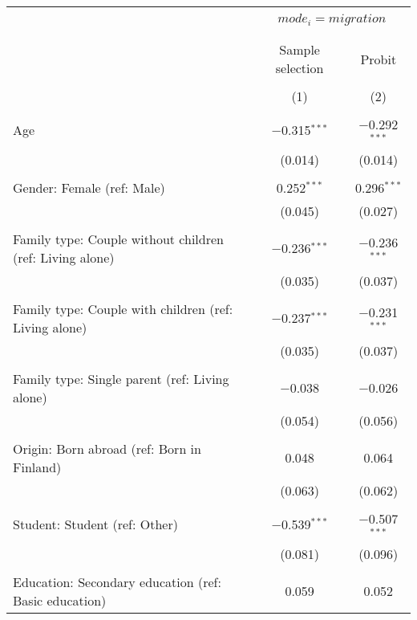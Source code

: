 
\begin{table}[!htbp] \centering 
  \caption{} 
  \label{} 
\begin{tabular}{@{\extracolsep{5pt}}lcc} 
\\[-1.8ex]\hline 
\hline \\[-1.8ex] 
 & \multicolumn{2}{c}{$mode_i = migration$} \\ 
\cline{2-3} 
\\[-1.8ex] &  &  \\ 
 & Sample selection & Probit \\ 
\\[-1.8ex] & (1) & (2)\\ 
\hline \\[-1.8ex] 
 Age & $-$0.315$^{***}$ & $-$0.292$^{***}$ \\ 
  & (0.014) & (0.014) \\ 
  & & \\ 
 Gender: Female (ref: Male) & 0.252$^{***}$ & 0.296$^{***}$ \\ 
  & (0.045) & (0.027) \\ 
  & & \\ 
 Family type: Couple without children (ref: Living alone) & $-$0.236$^{***}$ & $-$0.236$^{***}$ \\ 
  & (0.035) & (0.037) \\ 
  & & \\ 
 Family type: Couple with children (ref: Living alone) & $-$0.237$^{***}$ & $-$0.231$^{***}$ \\ 
  & (0.035) & (0.037) \\ 
  & & \\ 
 Family type: Single parent (ref: Living alone) & $-$0.038 & $-$0.026 \\ 
  & (0.054) & (0.056) \\ 
  & & \\ 
 Origin: Born abroad (ref: Born in Finland) & 0.048 & 0.064 \\ 
  & (0.063) & (0.062) \\ 
  & & \\ 
 Student: Student (ref: Other) & $-$0.539$^{***}$ & $-$0.507$^{***}$ \\ 
  & (0.081) & (0.096) \\ 
  & & \\ 
 Education: Secondary education (ref: Basic education) & 0.059 & 0.052 \\ 

\end{tabular}
\end{table}
